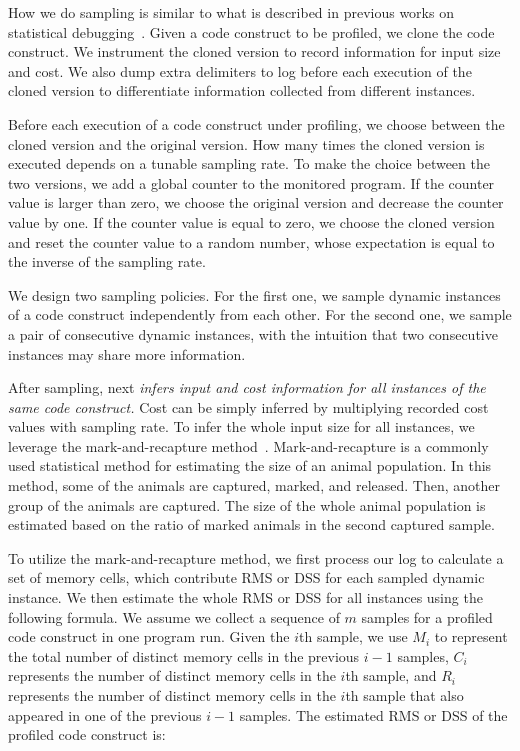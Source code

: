 {{How we do sampling is similar to what is described in previous works 
on statistical debugging~\cite{liblit03,liblit05,CCI,SongOOPSLA2014,ldoctor}.
Given a code construct to be profiled, 
we clone the code construct.
We instrument the cloned version to record information for input size and cost.
We also dump extra delimiters to log before each 
execution of the cloned version
to differentiate information collected from different instances. 


Before each execution of a code construct under profiling, 
we choose between the cloned version and the original version. 
How many times the cloned version is executed 
depends on a tunable sampling rate. 
To make the choice between the two versions,
we add a global counter to the monitored program. 
If the counter value is larger than zero, 
we choose the original version and decrease the counter value by one.
If the counter value is equal to zero,
we choose the cloned version and reset the counter value to 
a random number, 
whose expectation is 
equal to the inverse of the sampling rate.  

We design two sampling policies. 
For the first one, we sample dynamic instances of a code construct 
independently from each other.
For the second one, we sample a pair of consecutive dynamic instances, 
with the intuition that two consecutive 
instances may share more information.


After sampling, \Tool next \emph{infers input and cost information
for all instances of the same code construct.} 
Cost can be simply inferred by multiplying recorded cost values with sampling rate.
To infer the whole input size for all instances, 
we leverage the mark-and-recapture method~\cite{mark-recapture}. 
Mark-and-recapture is a commonly used statistical method 
for estimating the size of an animal population. 
In this method, some of the animals are captured, marked, and released. 
Then, another group of the animals are captured.
The size of the whole animal population is estimated 
based on the ratio of marked animals in the second captured sample. 
 

To utilize the mark-and-recapture method, 
we first process our log to calculate a set of memory cells, 
which contribute RMS
or DSS for each sampled dynamic instance. 
We then estimate the whole RMS or DSS for all instances using the following formula.
We assume we collect a sequence of $m$ samples for a profiled code construct 
in one program run.
Given the $i$th sample, we use $M_i$ to represent the 
total number of distinct memory cells in the previous $i-1$ samples, 
$C_i$ represents the number of distinct memory cells in the $i$th sample,
and $R_i$ represents the number of distinct memory cells in 
the $i$th sample that also appeared in one of the previous $i-1$ samples.
The estimated RMS or DSS of the profiled code construct is:

}}
